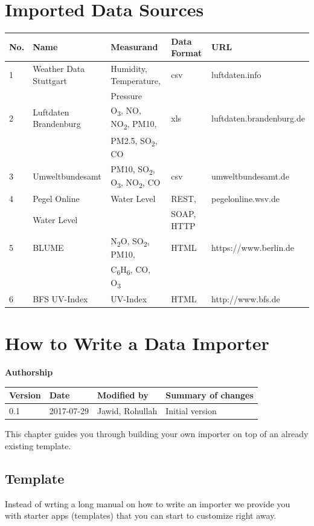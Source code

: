 \section{Imported Data Sources}

\begin{longtable}{lllll}
\toprule
 No. & Name  & Measurand & Data Format & URL \tabularnewline
\midrule
\endhead
 1 & Weather Data Stuttgart & Humidity, Temperature, & csv & luftdaten.info \tabularnewline
   & & Pressure & & \\
 2 & Luftdaten Brandenburg & O\textsubscript{3}, NO, NO\textsubscript{2}, PM10, & xls & luftdaten.brandenburg.de \tabularnewline
	 & & PM2.5, SO\textsubscript{2}, CO & & \tabularnewline
 3 & Umweltbundesamt & PM10, SO\textsubscript{2}, O\textsubscript{3}, NO\textsubscript{2}, CO & csv &  umweltbundesamt.de \tabularnewline
 4 & Pegel Online & Water Level & REST, & pegelonline.wsv.de \tabularnewline
   & Water Level & & SOAP, HTTP & \tabularnewline
 5 & BLUME & N\textsubscript{2}O, SO\textsubscript{2}, PM10, & HTML & https://www.berlin.de \tabularnewline
	 & & C\textsubscript{6}H\textsubscript{6}, CO, O\textsubscript{3} & & \tabularnewline
 6 & BFS UV-Index & UV-Index & HTML & http://www.bfs.de\tabularnewline
\bottomrule
\end{longtable}

\section{How to Write a Data Importer}\label{how-to-write-a-data-importer}

\textbf{Authorship}

\begin{longtable}[]{@{}llll@{}}
\toprule
Version & Date & Modified by & Summary of changes\tabularnewline
\midrule
\endhead
0.1 & 2017-07-29 & Jawid, Rohullah & Initial version\tabularnewline
\bottomrule
\end{longtable}

\vspace*{4mm}

This chapter guides you through building your own importer on top of an
already existing template.

\subsection{Template}\label{template}

Instead of wrting a long manual on how to write an importer we provide
you with starter apps (templates) that you can start to customize right
away.

